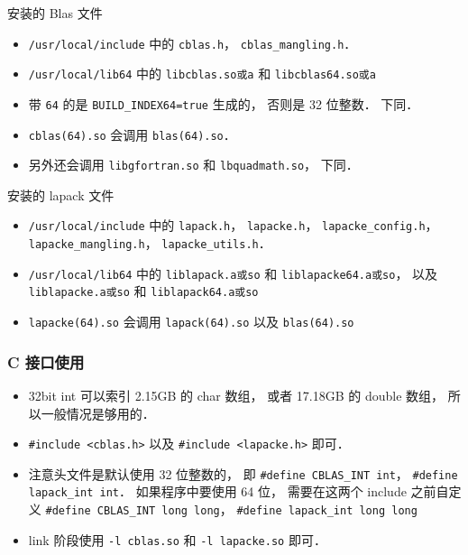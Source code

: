安装的 Blas 文件
\begin{itemize}
\item \verb|/usr/local/include| 中的 \verb|cblas.h|， \verb|cblas_mangling.h|．
\item \verb|/usr/local/lib64| 中的 \verb|libcblas.so或a| 和 \verb|libcblas64.so或a|
\item 带 \verb|64| 的是 \verb|BUILD_INDEX64=true| 生成的， 否则是 32 位整数． 下同．
\item \verb|cblas(64).so| 会调用 \verb|blas(64).so|．
\item 另外还会调用 \verb|libgfortran.so| 和 \verb|lbquadmath.so|， 下同．
\end{itemize}

安装的 lapack 文件
\begin{itemize}
\item \verb|/usr/local/include| 中的 \verb|lapack.h|， \verb|lapacke.h|， \verb|lapacke_config.h|， \verb|lapacke_mangling.h|， \verb|lapacke_utils.h|．
\item \verb|/usr/local/lib64| 中的 \verb|liblapack.a或so| 和 \verb|liblapacke64.a或so|， 以及 \verb|liblapacke.a或so| 和 \verb|liblapack64.a或so|
\item \verb|lapacke(64).so| 会调用 \verb|lapack(64).so| 以及 \verb|blas(64).so|
\end{itemize}

\subsubsection{C 接口使用}
\begin{itemize}
\item 32bit int 可以索引 2.15GB 的 char 数组， 或者 17.18GB 的 double 数组， 所以一般情况是够用的．
\item \verb|#include <cblas.h>| 以及 \verb|#include <lapacke.h>| 即可．
\item 注意头文件是默认使用 32 位整数的， 即 \verb|#define CBLAS_INT int|， \verb|#define lapack_int int|． 如果程序中要使用 64 位， 需要在这两个 include 之前自定义 \verb|#define CBLAS_INT long long|， \verb|#define lapack_int long long|
\item link 阶段使用 \verb|-l cblas.so| 和 \verb|-l lapacke.so| 即可．
\end{itemize}
